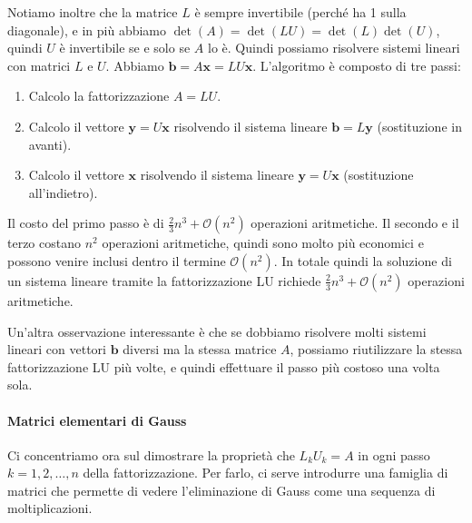 \documentclass[a4paper]{report}
\theoremstyle{definiton}
\theoremstyle{remark}
\newcommand{\x}{\mathbf{x}}
\renewcommand{\b}{\mathbf{b}}
\begin{document}
Notiamo inoltre che la matrice $L$ è sempre invertibile (perché ha 1 sulla diagonale), e in più abbiamo $\det(A) = \det(LU) = \det(L) \det(U)$, quindi $U$ è invertibile se e solo se $A$ lo è. Quindi possiamo risolvere sistemi lineari con matrici $L$ e $U$. Abbiamo $\b = A\x = LU\x$.
L'algoritmo è composto di tre passi:
\begin{enumerate}
    \item Calcolo la fattorizzazione $A=LU$.
    \item Calcolo il vettore $\mathbf{y}=U\x$ risolvendo il sistema lineare $\b=L\mathbf{y}$ (sostituzione in avanti).
    \item Calcolo il vettore $\x$ risolvendo il sistema lineare $\mathbf{y}=U\x$ (sostituzione all'indietro).
\end{enumerate}
Il costo del primo passo è di $\frac23 n^3 + \mathcal{O}(n^2)$ operazioni aritmetiche. Il secondo e il terzo costano $n^2$ operazioni aritmetiche, quindi sono molto più economici e possono venire inclusi dentro il termine $\mathcal{O}(n^2)$. In totale quindi la soluzione di un sistema lineare tramite la fattorizzazione LU richiede $\frac23 n^3 + \mathcal{O}(n^2)$ operazioni aritmetiche.

Un'altra osservazione interessante è che se dobbiamo risolvere molti sistemi lineari con vettori $\b$ diversi ma la stessa matrice $A$, possiamo riutilizzare la stessa fattorizzazione LU più volte, e quindi effettuare il passo più costoso una volta sola.

\paragraph{Matrici elementari di Gauss} Ci concentriamo ora sul dimostrare la proprietà che $L_k U_k = A$ in ogni passo $k=1,2,\dots,n$ della fattorizzazione. Per farlo, ci serve introdurre una famiglia di matrici che permette di vedere l'eliminazione di Gauss come una sequenza di moltiplicazioni.
\end{document}
